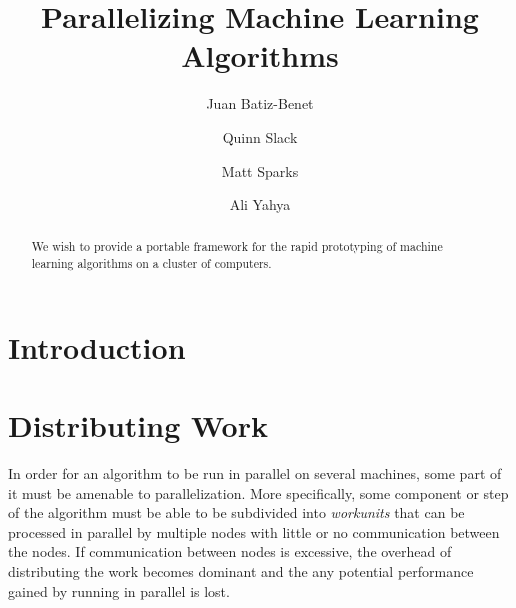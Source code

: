 \documentclass[%
        final,
        notitlepage,
        narroweqnarray,
        inline,
        ]{ieee}
\begin{document}
\title{Parallelizing Machine Learning Algorithms}

\author[SHORT NAMES]{
  Juan Batiz-Benet \\
  \and{\quad\quad}
  Quinn Slack \\
  \and{\quad\quad}
  Matt Sparks \\
  \and{\quad\quad}
  Ali Yahya
}




\maketitle

\begin{abstract}
We wish to provide a portable framework for the rapid prototyping of machine
learning algorithms on a cluster of computers.
\end{abstract}


\section{Introduction}

% 
% 

\section{Distributing Work}

In order for an algorithm to be run in parallel on several machines, some part
of it must be amenable to parallelization. More specifically, some component or
step of the algorithm must be able to be subdivided into \emph{workunits} that
can be processed in parallel by multiple nodes with little or no communication
between the nodes. If communication between nodes is excessive, the overhead of
distributing the work becomes dominant and the any potential performance gained
by running in parallel is lost.
\end{document}
